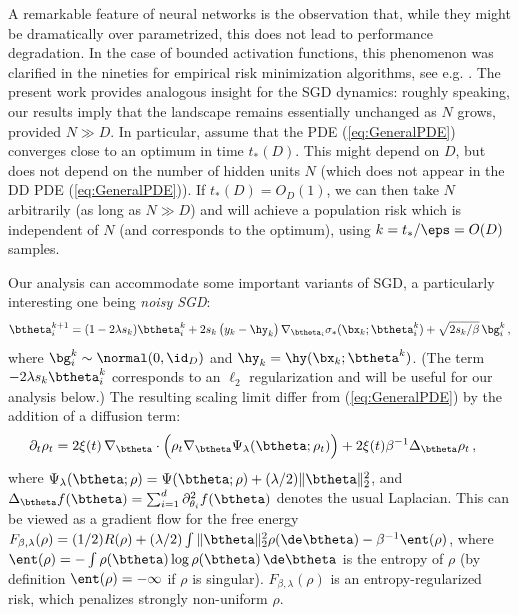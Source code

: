 \documentclass[11pt]{article}
\renewcommand{\eqref}[1]{(\ref{#1})}
\begin{document}
A remarkable feature of neural networks is the observation that, while they might be dramatically over parametrized,
this does not lead to performance degradation. In the case of bounded activation functions, this phenomenon  was clarified in the nineties
for empirical risk minimization algorithms, see e.g. \cite{bartlett1998sample}. The present work provides analogous insight for the 
SGD dynamics: roughly speaking, our results imply that the landscape 
remains essentially unchanged as $N$ grows, provided $N\gg D$.
In particular, assume that the PDE \eqref{eq:GeneralPDE} converges close to an optimum in time $t_*(D)$. This might depend on $D$, but does 
not depend on the number of hidden units 
$N$ (which does not appear in the DD PDE \eqref{eq:GeneralPDE}). If $t_*(D) =O_D(1)$, we can then take $N$ arbitrarily  (as long as $N\gg D$) and will achieve a population
risk which is independent of $N$ (and corresponds to the optimum), using $k=t_*/\eps = O(D)$ samples.

Our analysis can accommodate some important variants of SGD, a particularly interesting one being \emph{noisy SGD}:
%
\begin{equation}
%
\btheta_i^{k+1} = (1-2\lambda s_k) \btheta_i^{k}+ 2s_k\,\big(y_k-\hy_k\big)\, \nabla_{\btheta_i}\sigma_*(\bx_k;\btheta^k_i) +\sqrt{2s_k/\beta}\, \bg^k_i\, ,
\label{eq:Noisy_SGD}
%
\end{equation}
%
where $\bg^k_i\sim\normal(0,\id_D)$ and $\hy_k=\hy(\bx_k;\btheta^k)$. 
(The term $-2\lambda s_k \btheta_i^{k}$ corresponds to an $\ell_2$ regularization and will be useful for our analysis below.) 
The resulting scaling limit differ from \eqref{eq:GeneralPDE}  by the addition of a diffusion term:
%
\begin{align}
%
\partial_t \rho_t & =2\xi(t)\, \nabla_{\btheta}\cdot \Big(\rho_t \nabla_{\btheta}\Psi_{\lambda}(\btheta;\rho_t)\Big) +2\xi(t)\beta^{-1} \Delta_{\btheta}\rho_t\, ,\label{eq:GeneralPDE_Temp}
%
\end{align}
%
where $\Psi_{\lambda}(\btheta;\rho)=\Psi(\btheta;\rho)+(\lambda/2)\|\btheta\|_2^2$, and $\Delta_{\btheta}f(\btheta) = \sum_{i=1}^d\partial_{\theta_i}^2 f(\btheta)$
denotes the usual Laplacian.
This can be viewed as a gradient flow for the free energy $F_{\beta,\lambda}(\rho) = (1/2)R(\rho)+(\lambda/2)\int \|\btheta\|_2^2\rho(\de\btheta)-\beta^{-1} \ent(\rho)$, where 
$\ent(\rho) = -\int \rho(\btheta)\log \rho(\btheta)\, \de\btheta$ is the entropy of $\rho$ (by definition $\ent(\rho)=-\infty$ if
$\rho$ is singular).
$F_{\beta,\lambda}(\rho)$ is an entropy-regularized  risk, which penalizes strongly non-uniform $\rho$.
\end{document}
